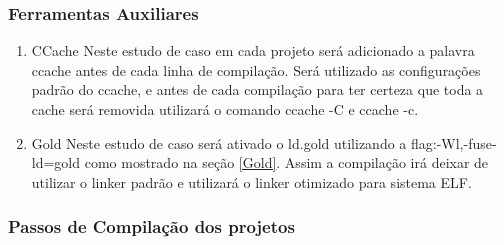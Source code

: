 \subsubsection{Ferramentas Auxiliares}

        \begin{enumerate}
               \item CCache
                    \subitem Neste estudo de caso em cada projeto será adicionado
 a palavra ccache antes de cada linha de compilação. Será utilizado as
 configurações padrão do ccache, e antes de cada compilação para ter certeza
 que toda a cache será removida utilizará o comando ccache -C e ccache -c.
                \item Gold
                    \subitem Neste estudo de caso será ativado o ld.gold
 utilizando a flag:-Wl,-fuse-ld=gold como mostrado na seção \ref{Gold}. Assim  a
 compilação irá deixar de utilizar o linker padrão e utilizará o linker
 otimizado para sistema ELF.
        \end{enumerate}

\subsubsection{Passos de Compilação dos projetos}

